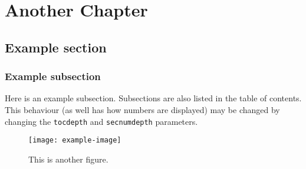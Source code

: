\chapter{Another Chapter}

\section{Example section}

\subsection{Example subsection}

Here is an example subsection.  Subsections are also listed in the table of contents.  This behaviour (as well has how numbers are displayed) may be changed by changing the \texttt{tocdepth} and \texttt{secnumdepth} parameters.

\begin{figure}
	\begin{center}
		\texttt{[image: example-image]}
		\caption{This is another figure.}
	\end{center}
\end{figure}
